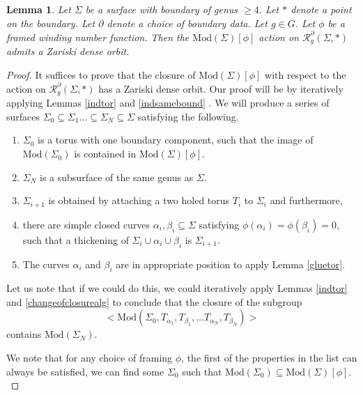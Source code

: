 \documentclass[10pt,a4paper]{amsart}
\newtheorem{lemma}{Lemma}
\newcommand{\Mod}{\textrm{Mod}}
\newcommand{\Rc}{\mathcal{R}}
\begin{document}
\begin{lemma}\label{framedense}
    Let $\Sigma$ be a surface with boundary of genus $ \ge 4$. Let $*$ denote a point on the boundary. Let $\partial$ denote a choice of boundary data. Let $g \in G$. Let $\phi$ be a framed winding number function. Then the $\Mod(\Sigma)[\phi]$ action on  $\Rc^{\partial}_g(\Sigma, *)$ admits a Zariski dense orbit.
\end{lemma}

\begin{proof}
It suffices to prove that the closure of $\Mod(\Sigma)[\phi]$ with respect to the action on $\Rc^{\partial}_g(\Sigma, *)$ has a Zariski dense orbit.
Our proof will be by iteratively applying Lemmas \ref{indtor} and \ref{indsamebound} . We will produce a series of surfaces $\Sigma_0 \subseteq  \Sigma_1 \dots \subseteq \Sigma_N \subseteq \Sigma$ satisfying the following.
\begin{enumerate}
   \item $\Sigma_0$ is a torus with one boundary component, such that the image of $\Mod(\Sigma_0)$ is contained in $\Mod(\Sigma)[\phi].$
    \item $\Sigma_N$ is a subsurface of the same genus as $\Sigma$.
    \item $\Sigma_{i+1}$ is obtained by attaching a two holed torus $T_i$ to $\Sigma_i$ and furthermore,
    \item there are simple closed curves $\alpha_i, \beta_i \subseteq \Sigma$ satisfying $\phi(\alpha_i) = \phi(\beta_i) =0,$ such that a thickening of $\Sigma_i \cup \alpha_i \cup \beta_i$ is $\Sigma_{i+1}.$
    \item The curves $\alpha_i$ and $\beta_i$ are in appropriate position to apply Lemma \ref{gluetor}.

\end{enumerate}
Let us note that if we could do this, we could iteratively apply Lemmas \ref{indtor} and \ref{changeofclosurealg} to conclude that  the closure of the subgroup $$<\Mod(\Sigma_0, T_{\alpha_1}, T_{\beta_1}, \dots T_{\alpha_N}, T_{\beta_N})>$$ contains $\Mod(\Sigma_N).$


 We note that for any choice of framing $\phi$, the first of the  properties in the list can always be satisfied, we can find some $\Sigma_0$ such that $\Mod(\Sigma_0) \subseteq \Mod(\Sigma)[\phi].$


\end{proof}
\end{document}
